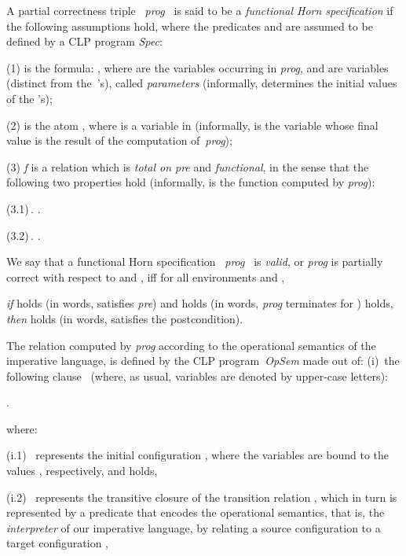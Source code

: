 \documentclass[english]{tlp}
\newcommand{\eop}{\hfill}
\begin{document}
\begin{definition}\label{def:spec} 
{\rm 
A partial correctness triple
\mbox{ {\textit{prog}} } is said to be a {\it functional Horn specification} if the following 
assumptions hold, where the predicates  and  are 
assumed to be defined by a CLP program \textit{Spec\/}:

\noindent\hangindent=4mm
(1)  is the formula: 
,
where  are the variables occurring in \textit{prog}, and
  are variables (distinct from the~'s), called
{\it parameters} (informally,   determines the 
initial values of the 's); 

\noindent\hangindent=4mm
(2)   is the atom , 
where  is a variable in  (informally, 
 is the variable whose final value is the result of 
the computation of~\textit{prog});

\noindent\hangindent=4mm
(3) \textit{f}\/ is a relation which is  {\it total on pre\/} and {\it functional}, in the sense that 
the following two properties hold (informally,  is the function
computed by \textit{prog}):

(3.1)\,.
. \nopagebreak

(3.2)\,. .~\eop
}\vspace*{-1mm}
\end{definition}

\noindent
We say that a functional Horn 
specification \mbox{ {\textit{prog}} } 
is {\it valid\/}, or \textit{prog} is 
partially correct with respect to  and , iff
for all environments
 and ,

\noindent 
{\it if}  holds (in words,   satisfies \textit{pre}) 
and  
\mbox{} holds (in words, 
\textit{prog} terminates for ) holds, 
{\it then}  holds (in words,  satisfies the postcondition).

The relation 
computed by \textit{prog} according to the operational semantics of 
the imperative language, is defined by the CLP 
program~\textit{OpSem} made out of: (i)~the following clause~
(where, as usual, variables are denoted by upper-case letters):

\noindent
.~~~ 

\noindent
where:

\noindent\hangindent=5mm
(i.1)~
represents the initial configuration , where the variables
 are bound to the values , respectively,
and  holds,

\noindent\hangindent=5mm
(i.2)~ represents the transitive closure
 of the transition relation , 
which in turn is represented by a predicate  
that encodes the operational semantics, that is, the
{\it interpreter} of our imperative language,
by relating a source configuration  to a target configuration ,
\end{document}
